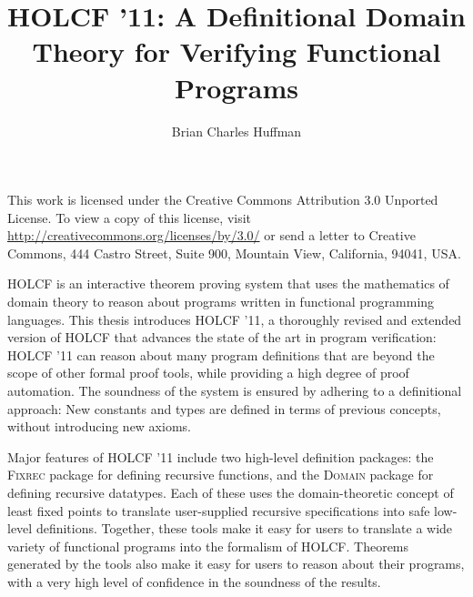 \documentclass[letterpaper,12pt]{report}
\newcommand{\HOLCF}[1]{HOLCF '#1}
\begin{document}
\title{\HOLCF{11}: A Definitional Domain Theory for Verifying Functional Programs}
\author{Brian Charles Huffman}

\tablespagefalse %


\titlep

\cleardoublepage
\begin{center}
\begin{minipage}{0.75\linewidth}
This work is licensed under the Creative Commons Attribution 3.0 Unported License. To view a copy of this license, visit \url{http://creativecommons.org/licenses/by/3.0/} or send a letter to Creative Commons, 444 Castro Street, Suite 900, Mountain View, California, 94041, USA.
\end{minipage}
\end{center}

\prefatory


HOLCF is an interactive theorem proving system that uses the mathematics of domain theory to reason about programs written in functional programming languages. This thesis introduces \HOLCF{11}, a thoroughly revised and extended version of HOLCF that advances the state of the art in program verification: \HOLCF{11} can reason about many program definitions that are beyond the scope of other formal proof tools, while providing a high degree of proof automation. The soundness of the system is ensured by adhering to a definitional approach: New constants and types are defined in terms of previous concepts, without introducing new axioms.

Major features of \HOLCF{11} include two high-level definition packages: the \textsc{Fixrec} package for defining recursive functions, and the \textsc{Domain} package for defining recursive datatypes. Each of these uses the domain-theoretic concept of least fixed points to translate user-supplied recursive specifications into safe low-level definitions. Together, these tools make it easy for users to translate a wide variety of functional programs into the formalism of HOLCF. Theorems generated by the tools also make it easy for users to reason about their programs, with a very high level of confidence in the soundness of the results.
\end{document}
